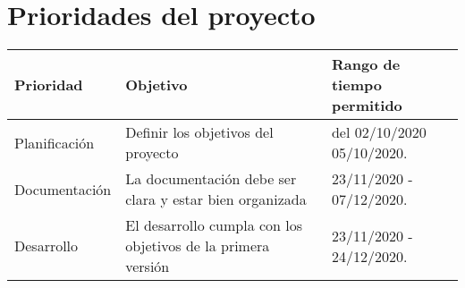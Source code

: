\documentclass[12pt,a4paper]{book}
\begin{document}
\section{Prioridades del proyecto}
\vspace{0.5 cm}
\begin{table}[h!]
\begin{tabular}{|p{5 cm}|p{5 cm}|p{5 cm}|}
\hline
\textbf{Prioridad}&\textbf{Objetivo}&\textbf{Rango de tiempo permitido}
\\\hline
Planificación&Definir los objetivos del proyecto & del 02/10/2020 05/10/2020.\\\hline
Documentación&La documentación debe ser clara y estar bien organizada& 23/11/2020 - 07/12/2020.\\\hline
Desarrollo&El desarrollo cumpla con los objetivos de la primera versión& 23/11/2020 - 24/12/2020.\\\hline
\end{tabular}
\end{table}

  
\end{document}
